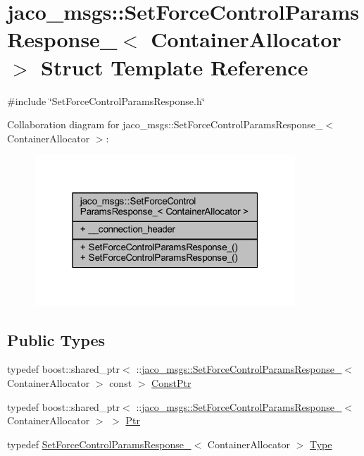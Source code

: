 \hypertarget{structjaco__msgs_1_1SetForceControlParamsResponse__}{}\section{jaco\+\_\+msgs\+:\+:Set\+Force\+Control\+Params\+Response\+\_\+$<$ Container\+Allocator $>$ Struct Template Reference}
\label{structjaco__msgs_1_1SetForceControlParamsResponse__}


{\ttfamily \#include \char`\"{}Set\+Force\+Control\+Params\+Response.\+h\char`\"{}}



Collaboration diagram for jaco\+\_\+msgs\+:\+:Set\+Force\+Control\+Params\+Response\+\_\+$<$ Container\+Allocator $>$\+:
\nopagebreak
\begin{figure}[H]
\begin{center}
\leavevmode
\includegraphics[width=277pt]{d1/d7e/structjaco__msgs_1_1SetForceControlParamsResponse____coll__graph}
\end{center}
\end{figure}
\subsection*{Public Types}
\begin{DoxyCompactItemize}
\item 
typedef boost\+::shared\+\_\+ptr$<$ \+::\hyperlink{structjaco__msgs_1_1SetForceControlParamsResponse__}{jaco\+\_\+msgs\+::\+Set\+Force\+Control\+Params\+Response\+\_\+}$<$ Container\+Allocator $>$ const  $>$ \hyperlink{structjaco__msgs_1_1SetForceControlParamsResponse___a1be8572b7aa81f0d904c12eb1e203a74}{Const\+Ptr}
\item 
typedef boost\+::shared\+\_\+ptr$<$ \+::\hyperlink{structjaco__msgs_1_1SetForceControlParamsResponse__}{jaco\+\_\+msgs\+::\+Set\+Force\+Control\+Params\+Response\+\_\+}$<$ Container\+Allocator $>$ $>$ \hyperlink{structjaco__msgs_1_1SetForceControlParamsResponse___a80a1f49c09c1d0ffccf753dbade78922}{Ptr}
\item 
typedef \hyperlink{structjaco__msgs_1_1SetForceControlParamsResponse__}{Set\+Force\+Control\+Params\+Response\+\_\+}$<$ Container\+Allocator $>$ \hyperlink{structjaco__msgs_1_1SetForceControlParamsResponse___a4925175e5a6228261ad680833a4f14a4}{Type}
\end{DoxyCompactItemize}
